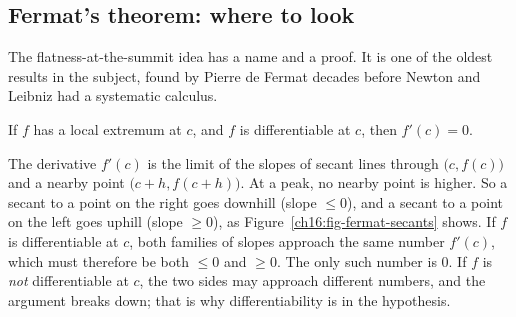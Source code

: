 \subsection{Fermat's theorem: where to look}

The flatness-at-the-summit idea has a name and a proof. It is one of the oldest
results in the subject, found by Pierre de Fermat decades before Newton and
Leibniz had a systematic calculus.

\begin{theorem}\label{ch16:thm-fermat}
If $f$ has a local extremum at $c$, and $f$ is differentiable at $c$, then
$f'(c)=0$.
\end{theorem}

\begin{intuitionbox}
The derivative $f'(c)$ is the limit of the slopes of secant lines through
$\big(c,f(c)\big)$ and a nearby point $\big(c+h,f(c+h)\big)$. At a peak, no
nearby point is higher. So a secant to a point on the right goes downhill (slope
$\le 0$), and a secant to a point on the left goes uphill (slope $\ge 0$), as
Figure~\ref{ch16:fig-fermat-secants} shows. If $f$ is differentiable at $c$,
both families of slopes approach the same number $f'(c)$, which must therefore be
both $\le 0$ and $\ge 0$. The only such number is $0$. If $f$ is \emph{not}
differentiable at $c$, the two sides may approach different numbers, and the
argument breaks down; that is why differentiability is in the hypothesis.
\end{intuitionbox}

